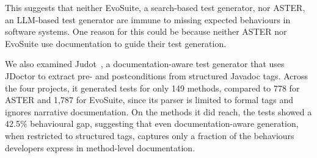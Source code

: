 This suggests that neither EvoSuite, a search-based test generator, nor ASTER, an LLM-based test generator are immune to missing expected behaviours in software systems.
One reason for this could be because neither ASTER nor EvoSuite use documentation to guide their test generation. 

We also examined Judot~\cite{denaro2025automatedtestgenerationprogram}, a documentation-aware test generator that uses JDoctor to extract pre- and postconditions from structured Javadoc tags. 
Across the four projects, it generated tests for only 149 methods, compared to 778 for ASTER and 1,787 for EvoSuite, since its parser is limited to formal tags and ignores narrative documentation. 
On the methods it did reach, the tests showed a 42.5\% behavioural gap, suggesting that even documentation-aware generation, when restricted to structured tags, captures only a fraction of the behaviours developers express in method-level documentation.





